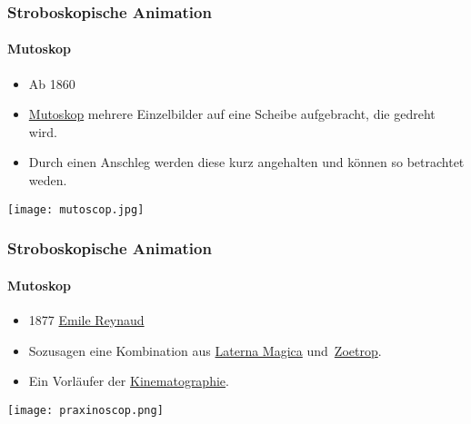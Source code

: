 \begin{frame}
    \frametitle{Stroboskopische Animation}
    \framesubtitle{Mutoskop}
    \begin{minipage}{0.5\textwidth}
        \begin{itemize}
            \item Ab 1860
            \item \href{https://de.wikipedia.org/wiki/Mutoskop}{Mutoskop} mehrere Einzelbilder auf eine Scheibe aufgebracht, die gedreht wird.
            \item Durch einen Anschleg werden diese kurz angehalten und können so betrachtet weden.
        \end{itemize}
    \end{minipage} \hfill
    \begin{minipage}{0.45\textwidth}
        \texttt{[image: mutoscop.jpg]}
    \end{minipage}
\end{frame}

\begin{frame}
    \frametitle{Stroboskopische Animation}
    \framesubtitle{Mutoskop}
    \begin{minipage}{0.5\textwidth}
        \begin{itemize}
            \item 1877 \href{https://de.wikipedia.org/wiki/\%C3\%89mile_Reynaud}{Emile Reynaud}
            \item Sozusagen eine Kombination aus \href{https://de.wikipedia.org/wiki/Laterna_magica}{Laterna Magica} und \href{https://de.wikipedia.org/wiki/Zoetrop}{Zoetrop}.
            \item Ein Vorläufer der \href{https://de.wikipedia.org/wiki/Bewegte_Bilder}{Kinematographie}.
        \end{itemize}
    \end{minipage} \hfill
    \begin{minipage}{0.45\textwidth}
        \texttt{[image: praxinoscop.png]}
    \end{minipage}
\end{frame}

%
%
%
%
%


